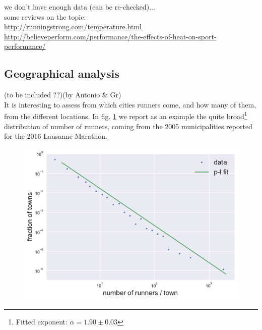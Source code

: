 \documentclass[fleqn,10pt]{wlscirep}
\begin{document}
			we don't have enough data (can be re-checked)...\\
			
			some reviews on the topic:\\
			\url{http://runningstrong.com/temperature.html}\\
			\url{http://believeperform.com/performance/the-effects-of-heat-on-sport-performance/}
			
	
	
		\subsection*{Geographical analysis}
	
			(to be included ??)(by Antonio \& Gr) \\			
			
			It is interesting to assess from which cities runners come, and how many of them, from the different locations. 
			In fig. \ref{origin_towns_dist} we report as an example the quite 
			broad\footnote{Fitted exponent: $ \alpha = 1.90 \pm 0.03 $} distribution of number of runners, coming from the 2005 municipalities reported for the 2016 Lausanne Marathon.
			
			\begin{figure}[h]	
				
				\centering
				
				\includegraphics[scale=0.6]{../data_analysis/plots_for_paper/origin_towns_dist.pdf}
				
				\caption{}
				
				\label{origin_towns_dist}
				
			\end{figure}								
	
\end{document}

